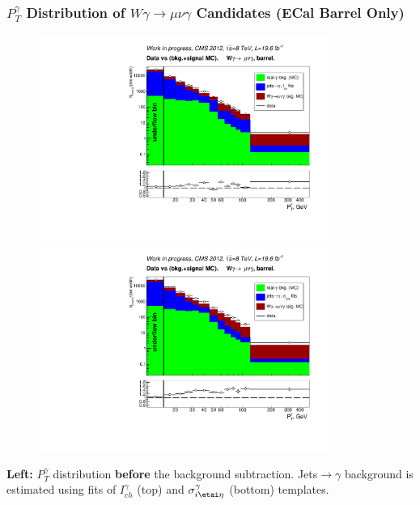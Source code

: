 \begin{frame}\frametitle{\footnotesize{$P_T^{\gamma}$ Distribution of $W\gamma\rightarrow\mu\nu\gamma$ Candidates (ECal Barrel Only)}}

\begin{minipage}[b]{0.49\textwidth}
   \begin{figure}[htb]
    \begin{center}
       \includegraphics[width=0.85\textwidth]{../figs/figs_v11/MUON_WGamma/PrepareYields/c_DATAvsBkgPlusSigMCc_MUON_WGamma_TEMPL_CHISO_UNblind__Barrel__phoEt.pdf}\\
       \includegraphics[width=0.85\textwidth]{../figs/figs_v11/MUON_WGamma/PrepareYields/c_DATAvsBkgPlusSigMCc_MUON_WGamma_TEMPL_SIHIH_UNblind__Barrel__phoEt.pdf}\\
    \end{center}
  \end{figure}
\end{minipage}%
\begin{minipage}[b]{0.49\textwidth}
\tiny
{\bfseries{Left:}} $P_T^{\gamma}$ distribution {\bfseries{before}} the background subtraction. Jets$\rightarrow\gamma$ background is estimated using fits of $I_{ch}^{\gamma}$ (top) and $\sigma_{i\etai\eta}^{\gamma}$ (bottom) templates.\\

\end{minipage}
\end{frame}

